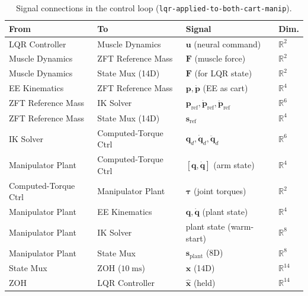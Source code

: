 \documentclass[11pt, a4paper]{article}
\begin{document}
\begin{table}[H]
\centering
\caption{Signal connections in the control loop (\texttt{lqr-applied-to-both-cart-manip}).}
\label{tab:signals}
\renewcommand{\arraystretch}{1.3}
\begin{tabular}{llll}
\toprule
\textbf{From} & \textbf{To} & \textbf{Signal} & \textbf{Dim.} \\
\midrule
LQR Controller        & Muscle Dynamics       & $\bm{u}$ (neural command)             & $\mathbb{R}^2$ \\
Muscle Dynamics       & ZFT Reference Mass    & $\bm{F}$ (muscle force)               & $\mathbb{R}^2$ \\
Muscle Dynamics       & State Mux (14D)       & $\bm{F}$ (for LQR state)             & $\mathbb{R}^2$ \\
EE Kinematics         & ZFT Reference Mass    & $\bm{p}, \dot{\bm{p}}$ (EE as cart)  & $\mathbb{R}^4$ \\
ZFT Reference Mass    & IK Solver             & $\bm{p}_{\mathrm{ref}}, \dot{\bm{p}}_{\mathrm{ref}}, \ddot{\bm{p}}_{\mathrm{ref}}$ & $\mathbb{R}^6$ \\
ZFT Reference Mass    & State Mux (14D)       & $\bm{s}_{\mathrm{ref}}$               & $\mathbb{R}^4$ \\
IK Solver             & Computed-Torque Ctrl  & $\bm{q}_d, \dot{\bm{q}}_d, \ddot{\bm{q}}_d$ & $\mathbb{R}^6$ \\
Manipulator Plant     & Computed-Torque Ctrl  & $[\bm{q}, \dot{\bm{q}}]$ (arm state) & $\mathbb{R}^4$ \\
Computed-Torque Ctrl  & Manipulator Plant     & $\bm{\tau}$ (joint torques)           & $\mathbb{R}^2$ \\
Manipulator Plant     & EE Kinematics         & $\bm{q}, \dot{\bm{q}}$ (plant state) & $\mathbb{R}^4$ \\
Manipulator Plant     & IK Solver             & plant state (warm-start)              & $\mathbb{R}^8$ \\
\midrule
Manipulator Plant     & State Mux             & $\bm{s}_{\mathrm{plant}}$ (8D)       & $\mathbb{R}^8$ \\
State Mux             & ZOH ($10\;\mathrm{ms}$) & $\bm{x}$ (14D)                     & $\mathbb{R}^{14}$ \\
ZOH                   & LQR Controller        & $\hat{\bm{x}}$ (held)                & $\mathbb{R}^{14}$ \\
\bottomrule
\end{tabular}
\end{table}
\end{document}
